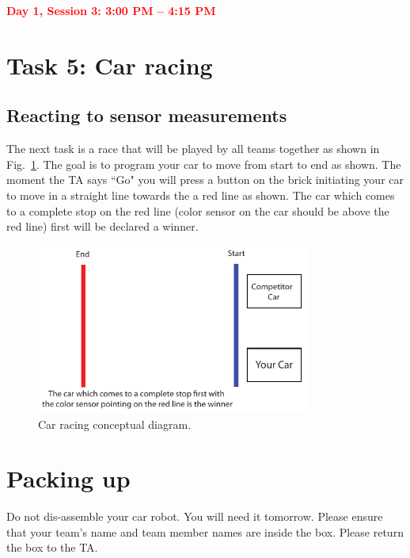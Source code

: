 \documentclass[11pt]{article}
\begin{document}
\vspace{0.5cm}
\noindent \textcolor{red}{\bf\Large Day 1, Session 3: 3:00 PM -- 4:15 PM} 
\section*{Task 5: Car racing}
\subsection*{Reacting to sensor measurements}
The next task is a race that will be played by all teams together as shown in Fig.~\ref{fig:car_racing}. The goal is to program your car to move from start to end as shown. The moment the TA says ``Go" you will press a button on the brick initiating your car to move in a straight line towards the a red line as shown. The car which comes to a complete stop on the red line (color sensor on the car should be above the red line) first will be declared a winner. 
\begin{figure}[htbp]
\begin{center}
 \includegraphics[angle=0, height=2.2in]{figures/car_race.pdf}
\end{center}
 \caption{Car racing conceptual diagram.}
   \label{fig:car_racing}
\end{figure}

\section*{Packing up}
Do not dis-assemble your car robot. You will need it tomorrow. Please ensure that your team's name and team member names are inside the box. Please return the box to the TA. 
\end{document}

